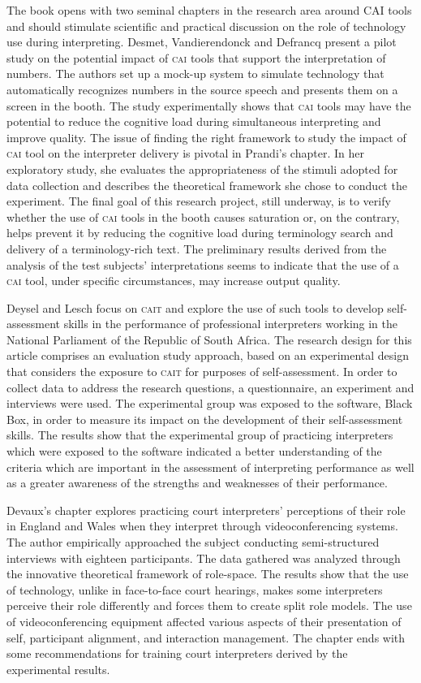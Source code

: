 \documentclass[output=paper]{langsci/langscibook}
\begin{document}
The book opens with two seminal chapters in the research area around CAI tools and should stimulate scientific and practical discussion on the role of technology use during interpreting. Desmet, Vandierendonck and Defrancq present a pilot study on the potential impact of \textsc{cai} tools that support the interpretation of numbers. The authors set up a mock-up system to simulate technology that automatically recognizes numbers in the source speech and presents them on a screen in the booth. The study experimentally shows that \textsc{cai} tools may have the potential to reduce the cognitive load during simultaneous interpreting and improve quality. The issue of finding the right framework to study the impact of \textsc{cai} tool on the interpreter delivery is pivotal in Prandi’s chapter. In her exploratory study, she evaluates the appropriateness of the stimuli adopted for data collection and describes the theoretical framework she chose to conduct the experiment. The final goal of this research project, still underway, is to verify whether the use of \textsc{cai} tools in the booth causes saturation or, on the contrary, helps prevent it by reducing the cognitive load during terminology search and delivery of a terminology-rich text. The preliminary results derived from the analysis of the test subjects’ interpretations seems to indicate that the use of a \textsc{cai} tool, under specific circumstances, may increase output quality. 
 
Deysel and Lesch focus on \textsc{cait} and explore the use of such tools to develop self-assessment skills in the performance of professional interpreters working in the National Parliament of the Republic of South Africa. The research design for this article comprises an evaluation study approach, based on an experimental design that considers the exposure to \textsc{cait} for purposes of self-assessment. In order to collect data to address the research questions, a questionnaire, an experiment and interviews were used. The experimental group was exposed to the software, Black Box, in order to measure its impact on the development of their self-assessment skills. The results show that the experimental group of practicing interpreters which were exposed to the software indicated a better understanding of the criteria which are important in the assessment of interpreting performance as well as a greater awareness of the strengths and weaknesses of their performance. 
 
Devaux’s chapter explores practicing court interpreters’ perceptions of their role in England and Wales when they interpret through videoconferencing systems. The author empirically approached the subject conducting semi-structured interviews with eighteen participants. The data gathered was analyzed through the innovative theoretical framework of role-space. The results show that the use of technology, unlike in face-to-face court hearings, makes some interpreters perceive their role differently and forces them to create split role models. The use of videoconferencing equipment affected various aspects of their presentation of self, participant alignment, and interaction management. The chapter ends with some recommendations for training court interpreters derived by the experimental results. 
 
\end{document}
